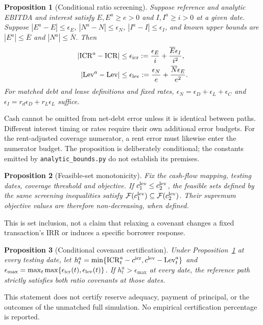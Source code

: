 \documentclass[11pt,a4paper]{article}
\newcommand{\ICR}{\mathrm{ICR}}
\newcommand{\Lev}{\mathrm{Lev}}
\theoremstyle{plain}
\newtheorem{proposition}{Proposition}
\theoremstyle{definition}
\begin{document}
\begin{proposition}[Conditional ratio screening]\label{prop:screening}
Suppose reference and analytic EBITDA and interest satisfy
$E,E^a\ge e>0$ and $I,I^a\ge i>0$ at a given date. Suppose
$|E^a-E|\le\epsilon_E$, $|N^a-N|\le\epsilon_N$,
$|I^a-I|\le\epsilon_I$, and known upper bounds are
$|E^a|\le\overline E$ and $|N^a|\le\overline N$. Then
\begin{align}
|\ICR^a-\ICR|&\le\epsilon_{\rm icr}
 :=\frac{\epsilon_E}{i}+\frac{\overline E\epsilon_I}{i^2},\\
|\Lev^a-\Lev|&\le\epsilon_{\rm lev}
 :=\frac{\epsilon_N}{e}+\frac{\overline N\epsilon_E}{e^2}.
\end{align}
For matched debt and lease definitions and fixed rates,
$\epsilon_N=\epsilon_D+\epsilon_L+\epsilon_C$ and
$\epsilon_I=r_d\epsilon_D+r_L\epsilon_L$ suffice.
\end{proposition}
Cash cannot be omitted from net-debt error unless it is identical between paths.
Different interest timing or rates require their own additional error budgets.
For the rent-adjusted coverage numerator, a rent error must likewise enter the
numerator budget. The proposition is deliberately conditional; the constants
emitted by \texttt{analytic\_bounds.py} do not establish its premises.

\begin{proposition}[Feasible-set monotonicity]\label{prop:frontier}
Fix the cash-flow mapping, testing dates, coverage threshold and objective. If
$c_1^{\rm lev}\le c_2^{\rm lev}$, the feasible sets defined by the same screening
inequalities satisfy $\mathcal F(c_1^{\rm lev})\subseteq\mathcal F(c_2^{\rm lev})$.
Their supremum objective values are therefore non-decreasing, when defined.
\end{proposition}
This is set inclusion, not a claim that relaxing a covenant changes a fixed
transaction's IRR or induces a specific borrower response.

\begin{proposition}[Conditional covenant certification]\label{prop:certification}
Under Proposition~\ref{prop:screening} at every testing date, let
$h_t^a=\min\{\ICR_t^a-c^{\rm icr},c^{\rm lev}-\Lev_t^a\}$ and
$\epsilon_{\max}=\max_t\max\{\epsilon_{\rm icr}(t),\epsilon_{\rm lev}(t)\}$.
If $h_t^a>\epsilon_{\max}$ at every date, the reference path strictly satisfies
both ratio covenants at those dates.
\end{proposition}
This statement does not certify reserve adequacy, payment of principal, or the
outcomes of the unmatched full simulation. No empirical certification percentage
is reported.
\end{document}
